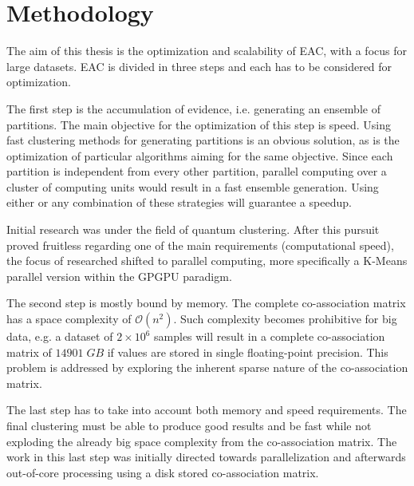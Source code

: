 
\chapter{Methodology}
\label{chapter:methodology}




The aim of this thesis is the optimization and scalability of EAC, with a focus for large datasets.
EAC is divided in three steps and each has to be considered for optimization.

The first step is the accumulation of evidence, i.e. generating an ensemble of partitions.
The main objective for the optimization of this step is speed.
Using fast clustering methods for generating partitions is an obvious solution, as is the optimization of particular algorithms aiming for the same objective.
Since each partition is independent from every other partition, parallel computing over a cluster of computing units would result in a fast ensemble generation.
Using either or any combination of these strategies will guarantee a speedup.

Initial research was under the field of quantum clustering.
After this pursuit proved fruitless regarding one of the main requirements (computational speed), the focus of researched shifted to parallel computing, more specifically a K-Means parallel version within the GPGPU paradigm.
	
The second step is mostly bound by memory.
The complete co-association matrix has a space complexity of $\mathcal{O}(n^2)$.
Such complexity becomes prohibitive for big data, e.g. a dataset of $2 \times 10^6$ samples will result in a complete co-association matrix of $14901 \; GB$ if values are stored in single floating-point precision.
This problem is addressed by exploring the inherent sparse nature of the co-association matrix.

The last step has to take into account both memory and speed requirements.
The final clustering must be able to produce good results and be fast while not exploding the already big space complexity from the co-association matrix.
The work in this last step was initially directed towards parallelization and afterwards out-of-core processing using a disk stored co-association matrix.%

